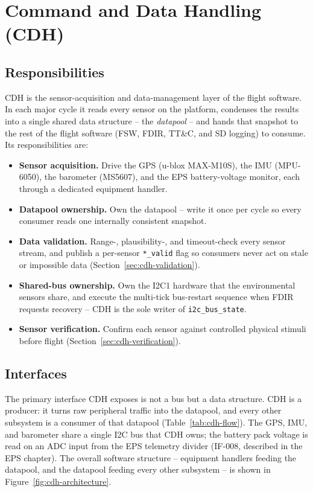\chapter{Command and Data Handling (CDH)}

\section{Responsibilities}

CDH is the sensor-acquisition and data-management layer of the flight
software. In each major cycle it reads every sensor on the platform,
condenses the results into a single shared data structure -- the
\emph{datapool} -- and hands that snapshot to the rest of the flight
software (FSW, FDIR, TT\&C, and SD logging) to consume. Its
responsibilities are:

\begin{itemize}
  \item \textbf{Sensor acquisition.} Drive the GPS (u-blox MAX-M10S), the
        IMU (MPU-6050), the barometer (MS5607), and the EPS battery-voltage
        monitor, each through a dedicated equipment handler.
  \item \textbf{Datapool ownership.} Own the datapool -- write it once per
        cycle so every consumer reads one internally consistent snapshot.
  \item \textbf{Data validation.} Range-, plausibility-, and timeout-check
        every sensor stream, and publish a per-sensor \texttt{*\_valid} flag
        so consumers never act on stale or impossible data
        (Section~\ref{sec:cdh-validation}).
  \item \textbf{Shared-bus ownership.} Own the I2C1 hardware that the
        environmental sensors share, and execute the multi-tick bus-restart
        sequence when FDIR requests recovery -- CDH is the sole writer of
        \texttt{i2c\_bus\_state}.
  \item \textbf{Sensor verification.} Confirm each sensor against
        controlled physical stimuli before flight
        (Section~\ref{sec:cdh-verification}).
\end{itemize}

\section{Interfaces}

The primary interface CDH exposes is not a bus but a data structure. CDH is
a producer: it turns raw peripheral traffic into the datapool, and every
other subsystem is a consumer of that datapool (Table~\ref{tab:cdh-flow}).
The GPS, IMU, and barometer share a single I2C bus that CDH owns; the
battery pack voltage is read on an ADC input from the EPS telemetry divider
(IF-008, described in the EPS chapter). The overall software structure --
equipment handlers feeding the datapool, and the datapool feeding every
other subsystem -- is shown in Figure~\ref{fig:cdh-architecture}.

